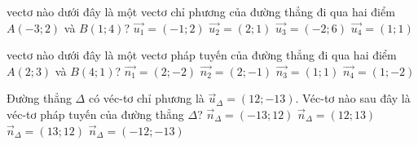 \begin{ex}%
	vectơ nào dưới đây là một vectơ chỉ phương  của đường thẳng đi qua hai điểm $A\left(-3;2\right)$ và $B\left(1;4\right)$?
	\choice 
		{$\overrightarrow{u_1}=\left(-1;2\right)$} 
		 {\True $\overrightarrow{u_2}=\left(2;1\right)$}
		 {$\overrightarrow{u_3}=\left(-2;6\right)$}
		{$\overrightarrow{u_4}=\left(1;1\right)$} 
\end{ex}

\begin{ex}%
	vectơ nào dưới đây là một vectơ  pháp tuyến của đường thẳng đi qua hai điểm $A\left(2;3\right)$ và $B\left(4;1\right)$?
	\choice 
		 {$\overrightarrow{n_1}=\left(2;-2\right)$}
		{$\overrightarrow{n_2}=\left(2;-1\right)$} 
		{\True  $\overrightarrow{n_3}=\left(1;1\right)$}
		 {$\overrightarrow{n_4}=\left(1;-2\right)$}
\end{ex}

\begin{ex}%
	Đường thẳng $\Delta$ có véc-tơ chỉ phương là $\overrightarrow{u}_{\Delta}=(12;-13)$. Véc-tơ nào sau đây là véc-tơ  pháp tuyến của đường thẳng $\Delta$?
	\choice 
		 {$\overrightarrow{n}_{\Delta}=(-13;12)$}
		{$\overrightarrow{n}_{\Delta}=(12;13)$} 
		 {\True $\overrightarrow{n}_{\Delta}=(13;12)$}
		 {$\overrightarrow{n}_{\Delta}=(-12;-13)$}
\end{ex}



